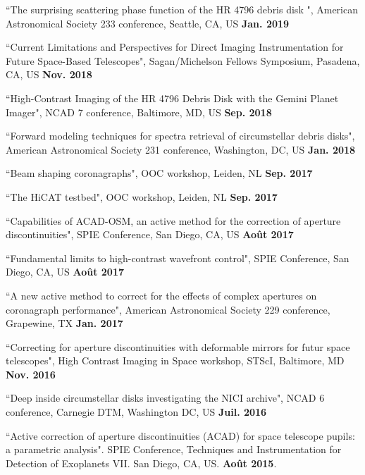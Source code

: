 \documentclass[11pt,a4paper, french]{article}
\begin{document}
\begin{etaremune}

\item ``The surprising scattering phase function of the HR 4796 debris disk ", American Astronomical Society 233 conference, Seattle, CA, US \textbf{Jan. 2019}

\item ``Current Limitations and Perspectives for Direct Imaging Instrumentation for Future Space-Based Telescopes", Sagan/Michelson Fellows Symposium, Pasadena, CA, US \textbf{Nov. 2018}

\item ``High-Contrast Imaging of the HR 4796 Debris Disk with the Gemini Planet Imager", NCAD 7 conference, Baltimore, MD, US \textbf{Sep. 2018}

\item ``Forward modeling techniques for spectra retrieval of circumstellar debris disks", American Astronomical Society 231 conference, Washington, DC, US \textbf{Jan. 2018}

\item ``Beam shaping coronagraphs", OOC workshop, Leiden, NL \textbf{Sep. 2017}

\item ``The HiCAT testbed", OOC workshop, Leiden, NL \textbf{Sep. 2017}

\item ``Capabilities of ACAD-OSM, an active method for the correction of aperture discontinuities", SPIE Conference, San Diego, CA, US \textbf{Août 2017}

\item ``Fundamental limits to high-contrast wavefront control", SPIE Conference, San Diego, CA, US \textbf{Août 2017}

\item ``A new active method to correct for the effects of complex apertures on coronagraph performance", American Astronomical Society 229 conference, Grapewine, TX \textbf{Jan. 2017}

\item ``Correcting for aperture discontinuities with deformable mirrors for futur space telescopes", High Contrast Imaging in Space workshop, STScI, Baltimore, MD \textbf{Nov. 2016}

\item ``Deep inside circumstellar disks investigating the NICI archive", NCAD 6 conference, Carnegie DTM, Washington DC, US \textbf{Juil. 2016}

\item ``Active correction of aperture discontinuities (ACAD) for space telescope pupils: a parametric analysis". SPIE Conference, Techniques and Instrumentation for Detection of Exoplanets VII. San Diego, CA, US. \textbf{Août 2015}.


\end{etaremune}
\end{document}
